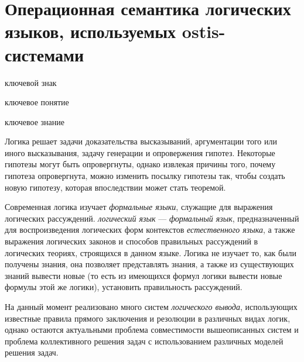 \section{Операционная семантика логических языков, используемых ostis-системами}
\label{logic_lang_os}

\begin{SCn}
	\begin{scnrelfromlist}{ключевой знак}
	\end{scnrelfromlist}
\end{SCn}

\begin{SCn}
	\begin{scnrelfromlist}{ключевое понятие}
	\end{scnrelfromlist}
\end{SCn}

\bigskip

\begin{SCn}
	\begin{scnrelfromlist}{ключевое знание}
	\end{scnrelfromlist}
\end{SCn}

\bigskip

Логика решает задачи доказательства высказываний, аргументации того или иного высказывания, задачу генерации и опровержения гипотез. Некоторые гипотезы могут быть опровергнуты, однако извлекая причины того, почему гипотеза опровергнута, можно изменить посылку гипотезы так, чтобы создать новую гипотезу, которая впоследствии может стать теоремой.

Современная логика изучает \textit{формальные языки}, служащие для выражения логических рассуждений. \textit{логический язык} — \textit{формальный язык}, предназначенный для воспроизведения логических форм контекстов \textit{естественного языка}, а также выражения логических законов и способов правильных рассуждений в логических теориях, строящихся в данном языке. Логика не изучает то, как были получены знания, она позволяет представлять знания, а также из существующих знаний вывести новые (то есть из имеющихся формул логики вывести новые формулы этой же логики), установить правильность рассуждений.

На данный момент реализовано много систем \textit{логического вывода}, использующих известные правила прямого заключения и резолюции в различных видах логик, однако остаются актуальными проблема совместимости вышеописанных систем и проблема коллективного решения задач с использованием различных моделей решения задач.


